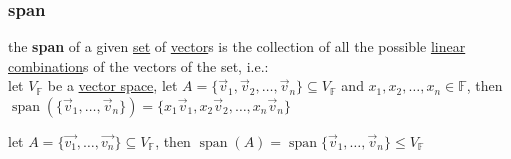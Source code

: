 \documentclass[a4paper,12pt]{article}
\DeclareMathOperator{\spn}{span}
\begin{document}
\subsubsection{span}
\label{sec:org1ee137f}
\begin{definition}
the \textbf{span} of a given \href{discrete_maths2.org}{set} of \hyperref[sec:org103a65e]{vector}s is the collection of all the possible \hyperref[sec:org0d4cbb4]{linear combination}s of the vectors of the set, i.e.:\\
let \(V_\mathbb{F}\) be a \hyperref[sec:orgea93933]{vector space}, let \(A = \{\vec{v}_1, \vec{v}_2, \ldots, \vec{v}_n\} \subseteq V_\mathbb{F}\) and \(x_1, x_2, \ldots, x_n \in \mathbb{F}\), then \(\spn(\{\vec{v}_1, \ldots, \vec{v}_n\}) = \{x_1\vec{v}_1, x_2\vec{v}_2, \ldots, x_n\vec{v}_n \}\)\\

\begin{lemma}
let \(A = \{\vec{v_1},\ldots,\vec{v_n}\} \subseteq V_\mathbb{F}\), then \(\spn(A) = \spn\{\vec{v}_1,\ldots,\vec{v}_n\} \leq V_\mathbb{F}\)\\


\end{lemma}
\end{definition}
\end{document}
